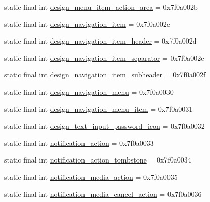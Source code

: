 \begin{DoxyCompactItemize}
\item 
static final int \mbox{\hyperlink{classandroid_1_1support_1_1design_1_1_r_1_1layout_a892f94461e21ef2384016ac479728ada}{design\+\_\+menu\+\_\+item\+\_\+action\+\_\+area}} = 0x7f0a002b
\item 
static final int \mbox{\hyperlink{classandroid_1_1support_1_1design_1_1_r_1_1layout_a6f870feafd3976058e65635845afdf28}{design\+\_\+navigation\+\_\+item}} = 0x7f0a002c
\item 
static final int \mbox{\hyperlink{classandroid_1_1support_1_1design_1_1_r_1_1layout_ad5d1e4411a5d259439aaeb5d66ee87e4}{design\+\_\+navigation\+\_\+item\+\_\+header}} = 0x7f0a002d
\item 
static final int \mbox{\hyperlink{classandroid_1_1support_1_1design_1_1_r_1_1layout_ad96876f67d154d3fd08794c12c1efc59}{design\+\_\+navigation\+\_\+item\+\_\+separator}} = 0x7f0a002e
\item 
static final int \mbox{\hyperlink{classandroid_1_1support_1_1design_1_1_r_1_1layout_a3d4b46f5c32b100f48b1cf108d0f5b68}{design\+\_\+navigation\+\_\+item\+\_\+subheader}} = 0x7f0a002f
\item 
static final int \mbox{\hyperlink{classandroid_1_1support_1_1design_1_1_r_1_1layout_a68f5d00d1b2b0dbca3b4c40fcc85bd25}{design\+\_\+navigation\+\_\+menu}} = 0x7f0a0030
\item 
static final int \mbox{\hyperlink{classandroid_1_1support_1_1design_1_1_r_1_1layout_acd70ec67d761277f1107f9dd89bc96a3}{design\+\_\+navigation\+\_\+menu\+\_\+item}} = 0x7f0a0031
\item 
static final int \mbox{\hyperlink{classandroid_1_1support_1_1design_1_1_r_1_1layout_ac329dd259163afccb61adabe0e1087c3}{design\+\_\+text\+\_\+input\+\_\+password\+\_\+icon}} = 0x7f0a0032
\item 
static final int \mbox{\hyperlink{classandroid_1_1support_1_1design_1_1_r_1_1layout_a62682e26dd7458358a71436219e3b29d}{notification\+\_\+action}} = 0x7f0a0033
\item 
static final int \mbox{\hyperlink{classandroid_1_1support_1_1design_1_1_r_1_1layout_ad1470d8708bc64b9fa90688c9ba2e8b8}{notification\+\_\+action\+\_\+tombstone}} = 0x7f0a0034
\item 
static final int \mbox{\hyperlink{classandroid_1_1support_1_1design_1_1_r_1_1layout_ae4178499ed0a627b4082b09cfae99907}{notification\+\_\+media\+\_\+action}} = 0x7f0a0035
\item 
static final int \mbox{\hyperlink{classandroid_1_1support_1_1design_1_1_r_1_1layout_a2afa4dd43d64918dd43e5c1b6ee43b97}{notification\+\_\+media\+\_\+cancel\+\_\+action}} = 0x7f0a0036

\end{DoxyCompactItemize}

